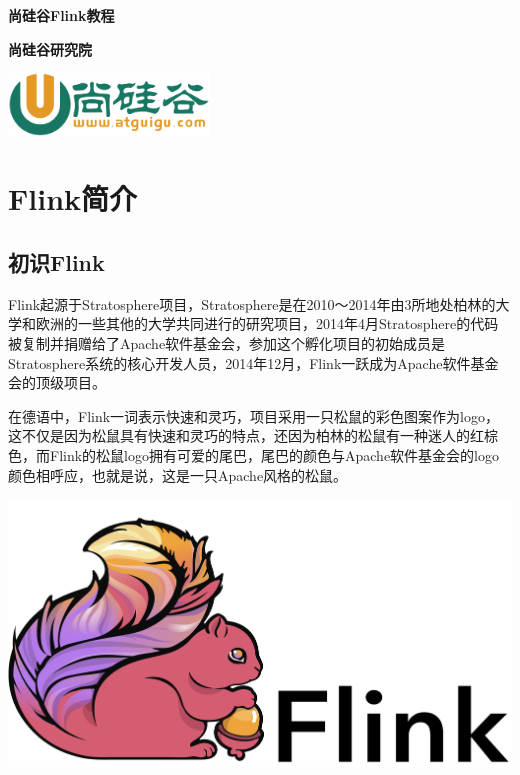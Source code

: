 \documentclass[oneside]{ctexbook}
\begin{document}
\begin{titlepage}
  \begin{center}
      \vspace*{1cm}

      \textbf{尚硅谷Flink教程}

      \vspace{1.5cm}

      \textbf{尚硅谷研究院}

      \vfill

      \vspace{0.8cm}

      \includegraphics[width=0.4\textwidth]{atguigu.jpeg}

  \end{center}
\end{titlepage}

\tableofcontents

\chapter{Flink简介}

\section{初识Flink}

Flink起源于Stratosphere项目，Stratosphere是在2010～2014年由3所地处柏林的大学和欧洲的一些其他的大学共同进行的研究项目，2014年4月Stratosphere的代码被复制并捐赠给了Apache软件基金会，参加这个孵化项目的初始成员是Stratosphere系统的核心开发人员，2014年12月，Flink一跃成为Apache软件基金会的顶级项目。

在德语中，Flink一词表示快速和灵巧，项目采用一只松鼠的彩色图案作为logo，这不仅是因为松鼠具有快速和灵巧的特点，还因为柏林的松鼠有一种迷人的红棕色，而Flink的松鼠logo拥有可爱的尾巴，尾巴的颜色与Apache软件基金会的logo颜色相呼应，也就是说，这是一只Apache风格的松鼠。

\noindent \includegraphics[width=\textwidth]{flink-header-logo.png}
\end{document}
